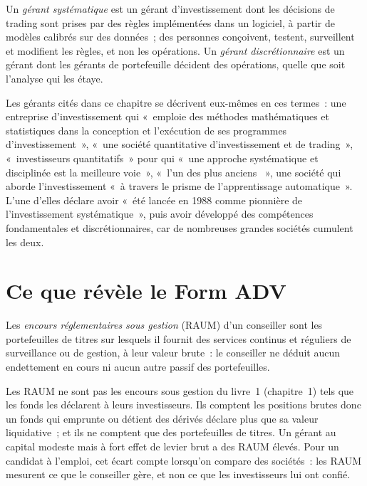 \begin{definition}\label{def:in:quantitative-hedge-funds-and-systematic-managers:sys}
Un \emph{gérant systématique} est un gérant d'investissement dont les décisions de trading sont prises par des règles
implémentées dans un logiciel, à partir de modèles calibrés sur des données~; des personnes conçoivent, testent, surveillent et modifient les règles, et non les
opérations. Un \emph{gérant discrétionnaire} est un gérant dont les gérants de portefeuille décident des opérations,
quelle que soit l'analyse qui les étaye.
\end{definition}

Les gérants cités dans ce chapitre se décrivent eux-mêmes en ces termes~: une entreprise d'investissement qui «~emploie des méthodes mathématiques
et statistiques dans la conception et l'exécution de ses programmes d'investissement~», «~une société quantitative d'investissement et de trading~»,
«~investisseurs quantitatifs~» pour qui «~une approche systématique et disciplinée est la meilleure voie~», «~l'un des
plus anciens ~», une société qui aborde l'investissement «~à travers le prisme de l'apprentissage automatique~».
L'une d'elles déclare avoir «~été lancée en 1988 comme pionnière de l'investissement systématique~», puis avoir développé des compétences fondamentales et discrétionnaires,
car de nombreuses grandes sociétés cumulent les deux.

\section{Ce que révèle le Form ADV}

\begin{definition}\label{def:in:quantitative-hedge-funds-and-systematic-managers:raum}
Les \emph{encours réglementaires sous gestion} (RAUM) d'un conseiller sont les portefeuilles de titres
sur lesquels il fournit des services continus et réguliers de surveillance ou de gestion, à leur valeur brute~: le
conseiller ne déduit aucun endettement en cours ni aucun autre passif des portefeuilles.
\end{definition}

Les RAUM ne sont pas les encours sous gestion du livre~1 (chapitre~1) tels que les fonds les déclarent à leurs investisseurs. Ils comptent les positions brutes
donc un fonds qui emprunte ou détient des dérivés déclare plus que sa valeur liquidative~; et ils ne comptent que
des portefeuilles de titres. Un gérant au capital modeste mais à fort effet de levier brut a des RAUM élevés. Pour un candidat à l'emploi, cet écart
compte lorsqu'on compare des sociétés~: les RAUM mesurent ce que le conseiller gère, et non ce que les investisseurs lui ont confié.

